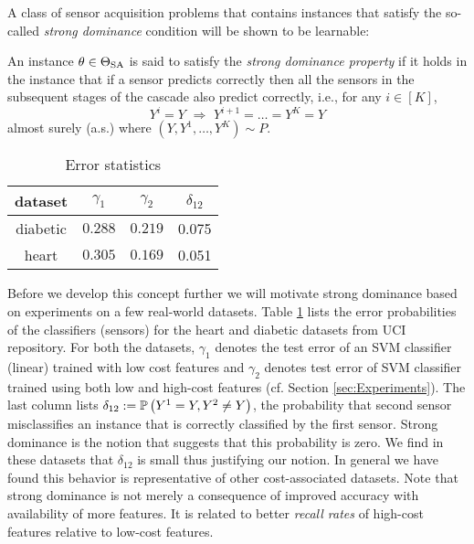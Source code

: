 A class of sensor acquisition problems that contains instances that satisfy the so-called \emph{strong dominance} condition 
will be shown to be learnable:
\begin{defi}
	An instance $\theta \in \Theta_{\mathrm{SA}}$  is said to satisfy the \emph{strong dominance property} if 
	it holds in the instance that if a sensor predicts correctly
	then all the sensors in the subsequent stages of the cascade also predict correctly, i.e., 
	for any $i\in [K]$,
	\begin{equation}
	\label{eqn:DominanceCondition}
	Y^i=Y \,\, \Rightarrow\,\, Y^{i+1}= \dots =  Y^K = Y
	\end{equation}
	almost surely (a.s.)
	where $(Y,Y^1,\dots,Y^K)\sim P$.
\end{defi}
\begin{table}[h]
\begin{center}
\begin{tabular}[c]{c|c|c|c } 
dataset & $\gamma_1$ & $\gamma_2$ & $\delta_{12}$\\ \hline \hline
diabetic & $0.288 $ & $ 0.219$  & 0.075\\  \hline
heart & $0.305$ & $0.169$ &  0.051\\  \hline
\end{tabular}
\label{tab:ErrorTable1}
\caption{Error statistics}
\end{center}
\end{table}
Before we develop this concept further we will motivate strong dominance based on experiments on a few real-world datasets. Table \ref{tab:ErrorTable1} lists the error probabilities of the classifiers (sensors) for the heart and diabetic datasets from UCI repository. For both the datasets, $\gamma_1$ denotes the test error of an SVM classifier (linear) trained with low cost features and $\gamma_2$ denotes test error of SVM classifier trained using both low and high-cost features (cf. Section \ref{sec:Experiments}). The last column lists $\delta_{12}:=\mathbb{P}\left(Y^1=Y, Y^2\neq Y\right)$, the probability that second sensor misclassifies an instance that is correctly classified by the first sensor. Strong dominance is the notion that suggests that this probability is zero. We find in these datasets that $\delta_{12}$ is small thus justifying our notion. In general we have found this behavior is representative of other cost-associated datasets. Note that strong dominance is not merely a consequence of improved accuracy with availability of more features. It is related to better {\it recall rates} of high-cost features relative to low-cost features. %




